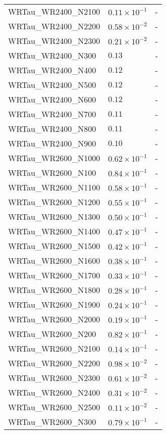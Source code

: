 \begin{longtable}[c]{| C{.35\textwidth} | C{.15\textwidth} | C{.1\textwidth}|}
    WRTau\_WR2400\_N2100 & $0.11\times10^{-1}$ & - \\
    WRTau\_WR2400\_N2200 & $0.58\times10^{-2}$ & - \\
    WRTau\_WR2400\_N2300 & $0.21\times10^{-2}$ & - \\
    WRTau\_WR2400\_N300 & $0.13$ & - \\
    WRTau\_WR2400\_N400 & $0.12$ & - \\
    WRTau\_WR2400\_N500 & $0.12$ & - \\
    WRTau\_WR2400\_N600 & $0.12$ & - \\
    WRTau\_WR2400\_N700 & $0.11$ & - \\
    WRTau\_WR2400\_N800 & $0.11$ & - \\
    WRTau\_WR2400\_N900 & $0.10$ & - \\ \hline
    WRTau\_WR2600\_N1000 & $0.62\times10^{-1}$ & - \\
    WRTau\_WR2600\_N100 & $0.84\times10^{-1}$ & - \\
    WRTau\_WR2600\_N1100 & $0.58\times10^{-1}$ & - \\
    WRTau\_WR2600\_N1200 & $0.55\times10^{-1}$ & - \\
    WRTau\_WR2600\_N1300 & $0.50\times10^{-1}$ & - \\
    WRTau\_WR2600\_N1400 & $0.47\times10^{-1}$ & - \\
    WRTau\_WR2600\_N1500 & $0.42\times10^{-1}$ & - \\
    WRTau\_WR2600\_N1600 & $0.38\times10^{-1}$ & - \\
    WRTau\_WR2600\_N1700 & $0.33\times10^{-1}$ & - \\
    WRTau\_WR2600\_N1800 & $0.28\times10^{-1}$ & - \\
    WRTau\_WR2600\_N1900 & $0.24\times10^{-1}$ & - \\
    WRTau\_WR2600\_N2000 & $0.19\times10^{-1}$ & - \\
    WRTau\_WR2600\_N200 & $0.82\times10^{-1}$ & - \\
    WRTau\_WR2600\_N2100 & $0.14\times10^{-1}$ & - \\
    WRTau\_WR2600\_N2200 & $0.98\times10^{-2}$ & - \\
    WRTau\_WR2600\_N2300 & $0.61\times10^{-2}$ & - \\
    WRTau\_WR2600\_N2400 & $0.31\times10^{-2}$ & - \\
    WRTau\_WR2600\_N2500 & $0.11\times10^{-2}$ & - \\
    WRTau\_WR2600\_N300 & $0.79\times10^{-1}$ & - \\

\end{longtable}
